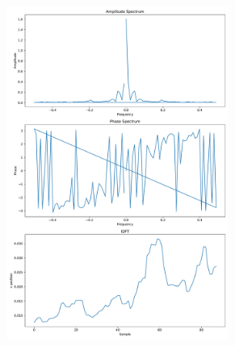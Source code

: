 \documentclass[10pt,dvipdfmx]{jsarticle}
\begin{document}
\begin{figure}[h]
\begin{subfigure}[b]{0.45\textwidth}
      \includegraphics[width=0.8\textwidth]{DFT2.pdf}
      \label{2}
\end{subfigure}
 \end{figure}
\end{document}
